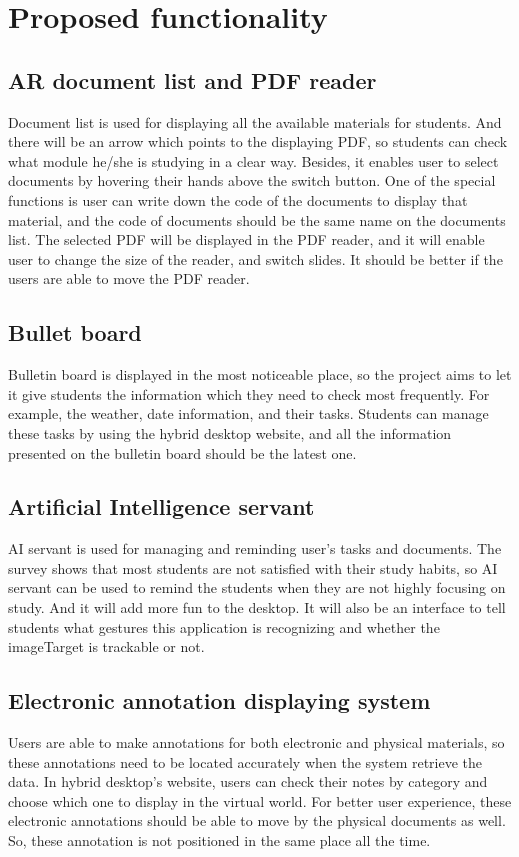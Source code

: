 \section{Proposed functionality}
\subsection{AR document list and PDF reader}
Document list is used for displaying all the available materials for students. And there will be an arrow which points to the displaying PDF, so students can check what module he/she is studying in a clear way. Besides, it enables user to select documents by hovering their hands above the switch button. One of the special functions is user can write down the code of the documents to display that material, and the code of documents should be the same name on the documents list. The selected PDF will be displayed in the PDF reader, and it will enable user to change the size of the reader, and switch slides. It should be better if the users are able to move the PDF reader.


\subsection{Bullet board}
Bulletin board is displayed in the most noticeable place, so the project aims to let it give students the information which they need to check most frequently. For example, the weather, date information, and their tasks. Students can manage these tasks by using the hybrid desktop website, and all the information presented on the bulletin board should be the latest one.


\subsection{Artificial Intelligence servant}
AI servant is used for managing and reminding user’s tasks and documents. The survey shows that most students are not satisfied with their study habits, so AI servant can be used to remind the students when they are not highly focusing on study. And it will add more fun to the desktop. It will also be an interface to tell students what gestures this application is recognizing and whether the imageTarget is trackable or not.

\subsection{Electronic annotation displaying system}
Users are able to make annotations for both electronic and physical materials, so these annotations need to be located accurately when the system retrieve the data. In hybrid desktop’s website, users can check their notes by category and choose which one to display in the virtual world. For better user experience, these electronic annotations should be able to move by the physical documents as well. So, these annotation is not positioned in the same place all the time.

